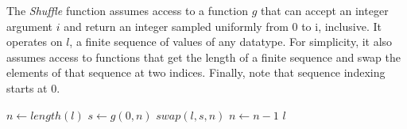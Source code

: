 The \textit{Shuffle} function assumes access to a function $g$ that can accept an integer argument $i$ and return an integer sampled uniformly from 0 to i, inclusive. It operates on $l$, a finite sequence of values of any datatype. For simplicity, it also assumes access to functions that get the length of a finite sequence and swap the elements of that sequence at two indices. Finally, note that sequence indexing starts at 0.

\begin{algorithmic}

  \State $n\gets length(l)$	
      \State $s\gets g(0, n)$
      \State $swap(l, s, n)$
      \State $n\gets n - 1$
  \EndWhile
  \State \Return $l$
\EndFunction

\end{algorithmic}